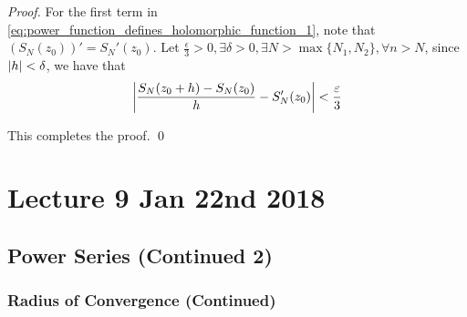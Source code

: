 \documentclass[notoc,notitlepage]{tufte-book}
\begin{document}
\begin{proof}
	For the first term in \cref{eq:power_function_defines_holomorphic_function_1}, note that $(S_N(z_0))' = S_N'(z_0)$. Let $\frac{\epsilon}{3} > 0, \exists \delta > 0, \exists N > \max\{N_1, N_2\}, \forall n > N$, since $\left|h\right| < \delta$, we have that
	\begin{equation*}
		\left|\frac{S_N(z_0 + h) - S_N(z_0)}{h} - S_N'(z_0)\right| < \frac{\varepsilon}{3}
	\end{equation*}

	This completes the proof. \qed
\end{proof}




\chapter{Lecture 9 Jan 22nd 2018}
	\label{chapter:lecture_9_jan_22nd_2018}

\section{Power Series (Continued 2)} %
\label{sec:power_series_continued_2}

\subsection{Radius of Convergence (Continued)} %
\label{sub:radius_of_convergence_continued}
\end{document}
